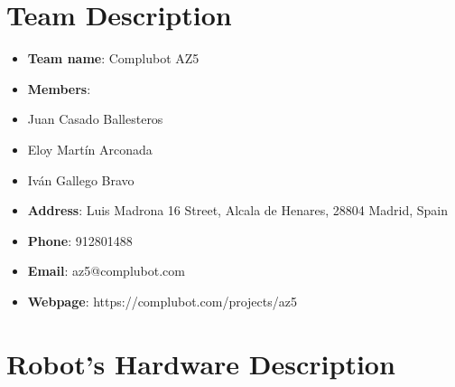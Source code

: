 
%
%

\section*{Team Description}
\begin{itemize}[nosep]
  \item \textbf{Team name}: Complubot AZ5
  \item \textbf{Members}:
  \item Juan Casado Ballesteros
  \item Eloy Martín Arconada
  \item Iván Gallego Bravo
  \item \textbf{Address}: Luis Madrona 16 Street, Alcala de Henares, 28804 Madrid, Spain 
  \item \textbf{Phone}: 912801488
  \item \textbf{Email}: az5@complubot.com
  \item \textbf{Webpage}: https://complubot.com/projects/az5
\end{itemize}


\section*{Robot's Hardware Description}
\label{sec:annex-OPL}

